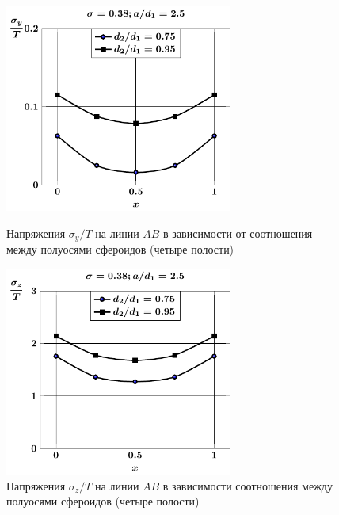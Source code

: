 \begin{russian}
\begin{figure}[h!]
\centering\footnotesize
\parbox[b]{7.5cm}{\centering\includegraphics[width=7.5cm]{cav4-d-sig_y.pdf}
\caption{Напряжения $\sigma_y/T$ на линии $AB$ в зависимости от соотношения между полуосями сфероидов (четыре полости)
\label{f:9:6}}}\hfil\hfil
\parbox[b]{7.5cm}{\centering\includegraphics[width=7.5cm]{cav4-d-sig_z.pdf}
\caption{Напряжения $\sigma_z/T$ на линии $AB$ в зависимости соотношения между полуосями сфероидов (четыре полости)
\label{f:9:7}}}
\end{figure}

%


\end{russian}

